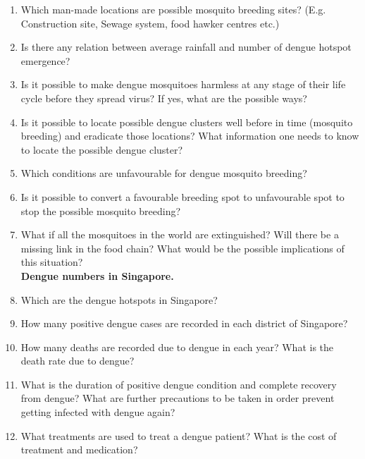 \documentclass[11pt]{exam}
\begin{document}
\begin{enumerate}
\item{} Which man-made locations are possible mosquito breeding sites? (E.g. Construction site, Sewage system, food hawker centres etc.)\\
\item{} Is there any relation between average rainfall and number of dengue hotspot emergence? \\ 
\item{} Is it possible to make dengue mosquitoes harmless at any stage of their life cycle before they spread virus? If yes, what are the possible ways?\\ 
\item{} Is it possible to locate possible dengue clusters well before in time (mosquito breeding) and eradicate those locations? What information one needs to know to locate the possible dengue cluster?\\ 
\item{} Which conditions are unfavourable for dengue mosquito breeding? \\ 
\item{} Is it possible to convert a favourable breeding spot to unfavourable spot to stop the possible mosquito breeding? \\ 
\item{} What if all the mosquitoes in the world are extinguished? Will there be a missing link in the food chain? What would be the possible implications of this situation? \\ 

\textbf{Dengue numbers in Singapore.} \\ 
\item{} Which are the dengue hotspots in Singapore? \\ %
\item{} How many positive dengue cases are recorded in each district of Singapore? \\ 
\item{} How many deaths are recorded due to dengue in each year? What is the death rate due to dengue? \\ 
\item{} What is the duration of positive dengue condition and complete recovery from dengue? What are further precautions to be taken in order prevent getting infected with dengue again? \\ 
\item{} What treatments are used to treat a dengue patient? What is the cost of treatment and 
    medication?\\
    

\end{enumerate}
\end{document}
